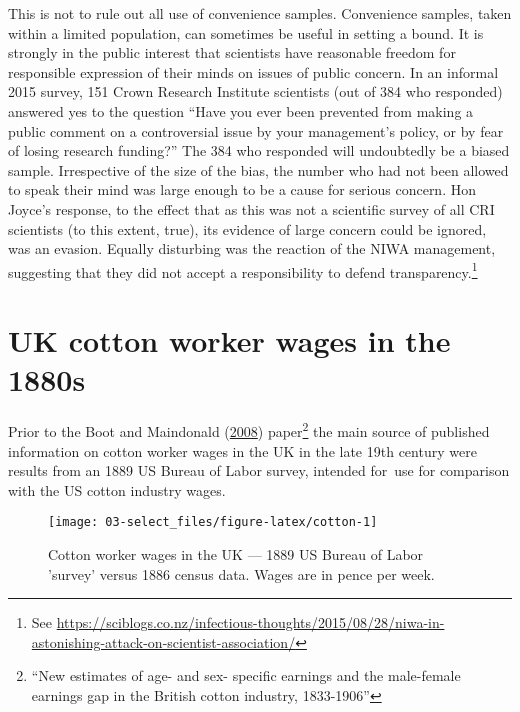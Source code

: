 \documentclass[
  10ptls,
  b5paper]{book}
\begin{document}
This is not to rule out all use of convenience samples.
Convenience samples, taken within a limited population,
can sometimes be useful in setting a bound.
It is strongly in the public interest that scientists have
reasonable freedom for responsible expression of their minds
on issues of public concern. In an informal 2015 survey, 151
Crown Research Institute scientists (out of 384 who responded)
answered yes to the question ``Have you ever been prevented
from making a public comment on a controversial issue by your
management's policy, or by fear of losing research funding?''
The 384 who responded will undoubtedly be a biased sample.
Irrespective of the size of the bias, the number who had not
been allowed to speak their mind was large enough to be a cause
for serious concern. Hon Joyce's response, to the effect that
as this was not a scientific survey of all CRI scientists
(to this extent, true), its evidence of large concern could be
ignored, was an evasion. Equally disturbing was the reaction
of the NIWA management, suggesting that they did not accept a
responsibility to defend transparency.\footnote{See \url{https://sciblogs.co.nz/infectious-thoughts/2015/08/28/niwa-in-astonishing-attack-on-scientist-association/}}

\hypertarget{uk-cotton-worker-wages-in-the-1880s}{%
\section{UK cotton worker wages in the 1880s}\label{uk-cotton-worker-wages-in-the-1880s}}

Prior to the Boot and Maindonald (\protect\hyperlink{ref-boot2008new}{2008}) paper\footnote{``New estimates of age- and sex- specific
  earnings and the male-female earnings gap in the British cotton
  industry, 1833-1906''} the main source of published information on
cotton worker wages in the UK in the late 19th century were results
from an 1889 US Bureau of Labor survey, intended for~use for
comparison with the US cotton industry wages.

\begin{figure}

{\centering \texttt{[image: 03-select\_files/figure-latex/cotton-1]} 

}

\caption{Cotton worker wages in the UK --- 1889 US Bureau of Labor 'survey'
versus 1886 census data. Wages are in pence per week.}\label{fig:cotton}
\end{figure}
\end{document}
